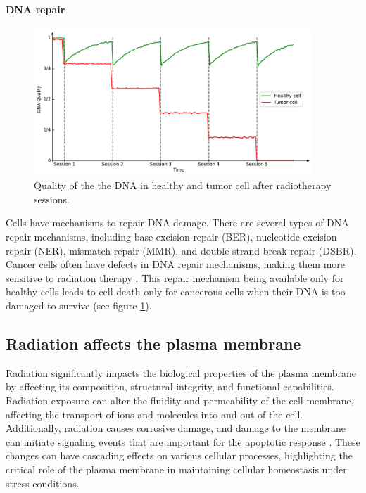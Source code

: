\paragraph{DNA repair}
\begin{figure}
	\centering
	\includegraphics[height=5.5cm]{_dna_quality.pdf}
	\caption{Quality of the the DNA in healthy and tumor cell after radiotherapy sessions.}
	\label{fig:dna_quality}
\end{figure}
Cells have mechanisms to repair DNA damage.
There are several types of DNA repair mechanisms, including base excision repair (BER), nucleotide excision repair (NER), mismatch repair (MMR), and double-strand break repair (DSBR).
Cancer cells often have defects in DNA repair mechanisms, making them more sensitive to radiation therapy \cite{Brierley2016}.
This repair mechanism being available only for healthy cells leads to cell death only for cancerous cells when their DNA is too damaged to survive (see figure  \ref{fig:dna_quality}).

\subsection{Radiation affects the plasma membrane}
Radiation significantly impacts the biological properties of the plasma membrane by affecting its composition, structural integrity, and functional capabilities.
Radiation exposure can alter the fluidity and permeability of the cell membrane, affecting the transport of ions and molecules into and out of the cell.
Additionally, radiation causes corrosive damage, and damage to the membrane can initiate signaling events that are important for the apoptotic response \cite{CohenJonathan1999}.
These changes can have cascading effects on various cellular processes, highlighting the critical role of the plasma membrane in maintaining cellular homeostasis under stress conditions.

